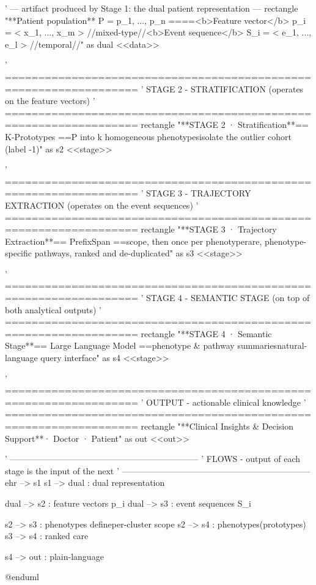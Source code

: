 ' --- artifact produced by Stage 1: the dual patient representation ---
rectangle "**Patient population**   P = { p_1, ..., p_n }\n====\n<b>Feature vector</b>   p_i = < x_1, ..., x_m >   //mixed-type//\n<b>Event sequence</b>   S_i = < e_1, ..., e_l >   //temporal//" as dual <<data>>

' ==================================================================
'  STAGE 2 - STRATIFICATION  (operates on the feature vectors)
' ==================================================================
rectangle "**STAGE 2  ·  Stratification**\n== K-Prototypes ==\nPartition P into k homogeneous phenotypes\nand isolate the outlier cohort (label -1)" as s2 <<stage>>

' ==================================================================
'  STAGE 3 - TRAJECTORY EXTRACTION  (operates on the event sequences)
' ==================================================================
rectangle "**STAGE 3  ·  Trajectory Extraction**\n== PrefixSpan ==\nGlobal scope, then once per phenotype\nReveals rare, phenotype-specific pathways\nClosed, ranked and de-duplicated" as s3 <<stage>>

' ==================================================================
'  STAGE 4 - SEMANTIC STAGE  (on top of both analytical outputs)
' ==================================================================
rectangle "**STAGE 4  ·  Semantic Stage**\n== Large Language Model ==\nReadable phenotype & pathway summaries\nConstrained natural-language query interface" as s4 <<stage>>

' ==================================================================
'  OUTPUT  -  actionable clinical knowledge
' ==================================================================
rectangle "**Clinical Insights & Decision Support**\nManager   ·   Doctor   ·   Patient" as out <<out>>

' ------------------------------------------------------------------
'  FLOWS  -  output of each stage is the input of the next
' ------------------------------------------------------------------
ehr  --> s1
s1   --> dual : dual representation

dual --> s2 : feature vectors  p_i
dual --> s3 : event sequences  S_i

s2   --> s3 : phenotypes define\nthe per-cluster scope
s2   --> s4 : phenotypes\n(prototypes)
s3   --> s4 : ranked care\npathways

s4   --> out : plain-language\nknowledge

@enduml
